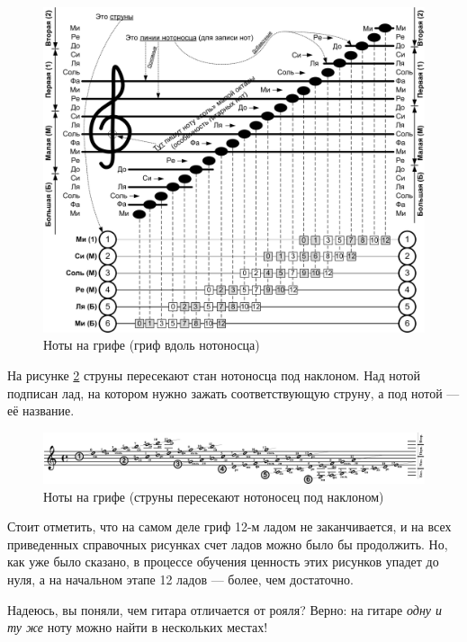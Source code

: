 \begin{figure}[!ht]
    \centering
    \includegraphics[width=\textwidth]{fig/lad-by-griph} 
    \caption{Ноты на грифе (гриф вдоль нотоносца)}\label{fig:guitar:lad-by-griph}
\end{figure} 

На рисунке \ref{fig:guitar:lad-by-diagonal} струны пересекают стан нотоносца под наклоном. Над нотой подписан лад, на котором нужно зажать соответствующую струну, а под нотой --- её название.

\begin{figure}[!ht]
    \centering
    \includegraphics[width=\textwidth]{fig/lad-by-diagonal} 
    \caption{Ноты на грифе (струны пересекают нотоносец под наклоном)}\label{fig:guitar:lad-by-diagonal}
\end{figure} 


Стоит отметить, что на самом деле гриф 12-м ладом не заканчивается, и на всех приведенных справочных рисунках счет ладов можно было бы продолжить. Но, как уже было сказано, в процессе обучения ценность этих рисунков упадет до нуля, а на начальном этапе 12 ладов --- более, чем достаточно.

Надеюсь, вы поняли, чем гитара отличается от рояля? Верно: на гитаре \emph{одну и ту же} ноту можно найти в нескольких местах!

